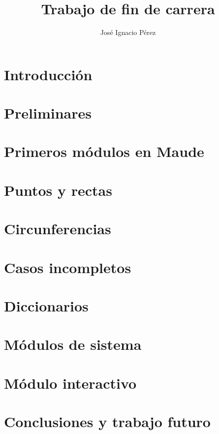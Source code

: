 \documentclass[12pt,a4paper,draft]{book}
\author{Jos\'e Ignacio P\'erez}
\title{Trabajo de fin de carrera}
\begin{document}
\newcommand{\codesize}{\small}

\frontmatter
\tableofcontents

\mainmatter
\chapter{Introducción}\label{ch:intro}

\chapter{Preliminares}\label{cap.0}

\chapter{Primeros módulos en Maude}\label{cap.1}

\chapter{Puntos y rectas}\label{cap.2}

\chapter{Circunferencias}\label{cap.3}

\chapter{Casos incompletos}\label{cap.4}

\chapter{Diccionarios}\label{cap.5}

\chapter{Módulos de sistema}\label{cap.6}

\chapter{Módulo interactivo}\label{cap.7}

\chapter{Conclusiones y trabajo futuro}\label{cap.10}

\backmatter

\end{document}
